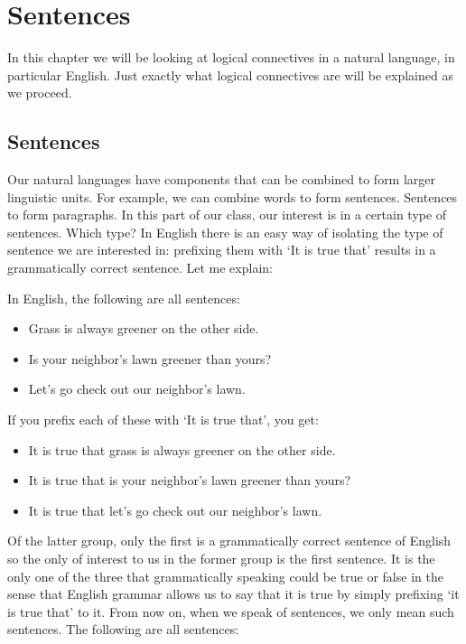 
\section{Sentences}\label{sec:SL-intro}


In this chapter we will be looking at logical connectives in a natural language,
 in particular English.  Just exactly what logical connectives are will be 
 explained as we proceed.


\subsection{Sentences}

Our natural languages have components that can be combined to form larger 
linguistic units. For example, we can combine words to form sentences.  
Sentences to form paragraphs. In this part of our class, our interest is in a 
certain type of sentences. Which type? In English there is an easy way of 
isolating the type of sentence we are interested in: prefixing them with `It is 
true that' results in a grammatically correct sentence. Let me explain:

In English, the following are all sentences:

\begin{itemize}

 \item Grass is always greener on the other side.

 \item Is your neighbor's lawn greener than yours?

 \item Let's go check out our neighbor's lawn.

\end{itemize}

If you prefix each of these with `It is true that', you get:

\begin{itemize}

 \item It is true that grass is always greener on the other side.

 \item It is true that is your neighbor's lawn greener than yours?

 \item It is true that let's go check out our neighbor's lawn.

\end{itemize}

Of the latter group, only the first is a grammatically correct sentence of 
English so the only of interest to us in the former group is the first sentence.  
It is the only one of the three that grammatically speaking could be true or 
false in the sense that English grammar allows us to say that it is true by 
simply prefixing `it is true that' to it.  From now on, when we speak of 
sentences, we only mean such sentences.  The following are all sentences:

